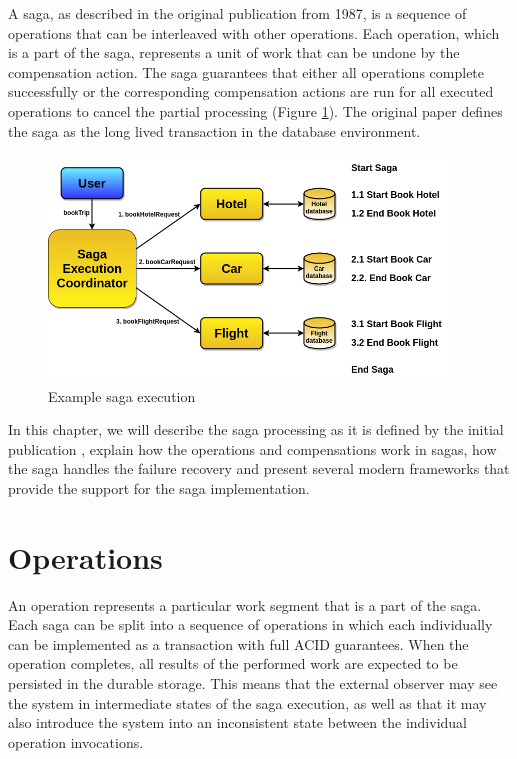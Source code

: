 \documentclass[oneside,
  digital, %
  table,   %
  lof,     %
  lot,     %
]{fithesis3}
\begin{document}
A saga, as described in the original publication \cite{sagas_publ} from 1987, is a sequence of operations that can be interleaved with other operations. Each operation, which is a part of the saga, represents a unit of work that can be undone by the compensation action. The saga guarantees that either all operations complete successfully or the corresponding compensation actions are run for all executed operations to cancel the partial processing (Figure \ref{fig:tripExample}). The original paper \cite{sagas_publ} defines the saga as the long lived transaction in the database environment.

\begin{figure}[h]
    \begin{center}
        \includegraphics[height=60mm]{images/tripExample.png}
    \end{center}
    \caption{Example saga execution}
    \label{fig:tripExample}
\end{figure}

In this chapter, we will describe the saga processing as it is defined by the initial publication \cite{sagas_publ}, explain how the operations and compensations work in sagas, how the saga handles the failure recovery and present several modern frameworks that provide the support for the saga implementation. 

\section{Operations}

An operation represents a particular work segment that is a part of the saga. Each saga can be split into a sequence of operations in which each individually can be implemented as a transaction with full ACID guarantees. When the operation completes, all results of the performed work are expected to be persisted in the durable storage. This means that the external observer may see the system in intermediate states of the saga execution, as well as that it may also introduce the system into an inconsistent state between the individual operation invocations.
\end{document}

